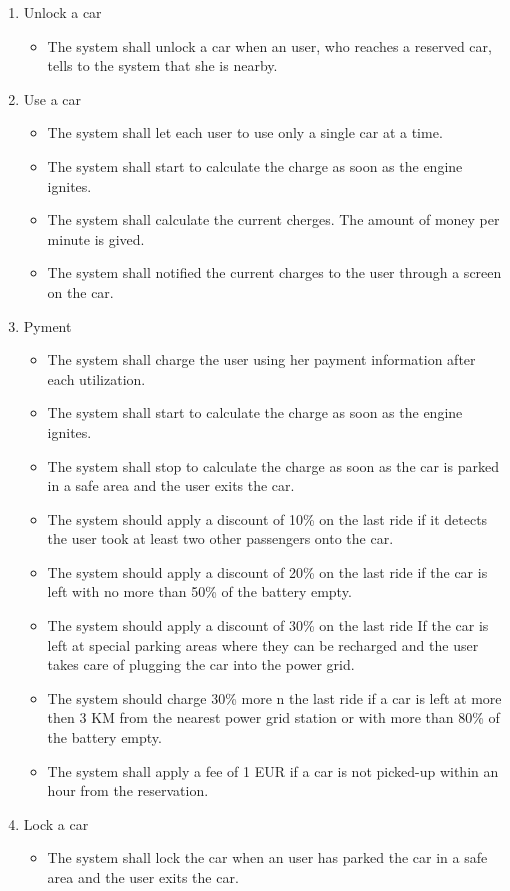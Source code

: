 \begin{itemize}
\begin{enumerate}
	\item Unlock a car
	\begin{itemize}
	\item The system shall unlock a car when an user, who reaches a reserved car, tells to the system that she is nearby.
	\end{itemize}


	\item Use a car
	\begin{itemize}
	\item The system shall let each user to use only a single car at a time.
	\item The system shall start to calculate the charge as soon as the engine ignites.
	\item The system shall calculate the current cherges. The amount of money per minute is gived.
	\item The system shall notified the current charges to the user through a screen on the car.
	\end{itemize}
	
	\item Pyment
	\begin{itemize}
	\item The system shall charge the user using her payment information after each utilization.
	\item The system shall start to calculate the charge as soon as the engine ignites.
	\item The system shall stop to calculate the charge as soon as the car is parked in a safe area and the user exits the car.%
	\item The system should apply a discount of 10\% on the last ride if it detects the user took at least two other passengers onto the car.
	\item The system should apply a discount of 20\% on the last ride if the car is left with no more than 50\% of the battery empty.
	\item The system should apply a discount of 30\% on the last ride If the car is left at special parking areas where they can be recharged and the user takes care of plugging the car into the power grid.
	\item The system should charge 30\% more n the last ride if a car is left at more then 3 KM  from the nearest power grid station or with more than 80\% of the battery empty.
	\item The system shall apply a fee of 1 EUR if a car is not picked-up within an hour from the reservation.
	\end{itemize}

	\item Lock a car
	\begin{itemize}
	\item The system shall lock the car when an user has parked the car in a safe area and the user exits the car. 
	\end{itemize}
	
\end{enumerate}

\end{itemize}




